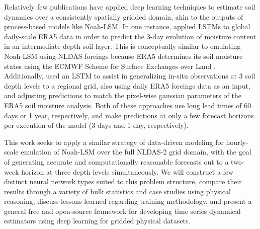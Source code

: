 Relatively few publications have applied deep learning techniques to estimate soil dynamics over a consistently spatially gridded domain, akin to the outputs of process-based models like Noah-LSM.  In one instance, \citep{filipovic_regional_2022} applied LSTMs to global daily-scale ERA5 data in order to predict the 3-day evolution of moisture content in an intermediate-depth soil layer. This is conceptually similar to emulating Noah-LSM using NLDAS forcings because ERA5 determines its soil moisture states using the ECMWF Scheme for Surface Exchanges over Land \citep{balsamo_revised_2009}. Additionally, \citep{o_global_2021} used an LSTM to assist in generalizing in-situ observations at 3 soil depth levels to a regional grid, also using daily ERA5 forcings data as an input, and adjusting predictions to match the pixel-wise gaussian parameters of the ERA5 soil moisture analysis. Both of these approaches use long lead times of 60 days or 1 year, respectively, and make predictions at only a few forecast horizons per execution of the model (3 days and 1 day, respectively).

This work seeks to apply a similar strategy of data-driven modeling for hourly-scale emulation of Noah-LSM over the full NLDAS-2 grid domain, with the goal of generating accurate and computationally reasonable forecasts out to a two-week horizon at three depth levels simultaneously. We will construct a few distinct neural network types suited to this problem structure, compare their results through a variety of bulk statistics and case studies using physical reasoning, discuss lessons learned regarding training methodology, and present a general free and open-source framework for developing time series dynamical estimators using deep learning for gridded physical datasets.
